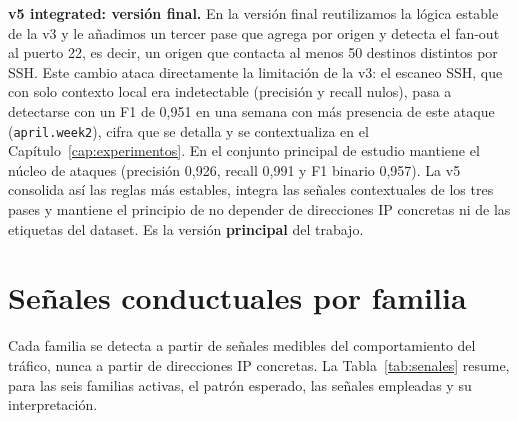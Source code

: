 \textbf{v5 integrated: versión final.} En la versión final reutilizamos la lógica estable de la v3 y le añadimos un tercer pase que agrega por origen y detecta el fan-out al puerto 22, es decir, un origen que contacta al menos 50 destinos distintos por SSH. Este cambio ataca directamente la limitación de la v3: el escaneo SSH, que con solo contexto local era indetectable (precisión y recall nulos), pasa a detectarse con un F1 de 0,951 en una semana con más presencia de este ataque (\texttt{april.week2}), cifra que se detalla y se contextualiza en el Capítulo~\ref{cap:experimentos}. En el conjunto principal de estudio mantiene el núcleo de ataques (precisión 0,926, recall 0,991 y F1 binario 0,957). La v5 consolida así las reglas más estables, integra las señales contextuales de los tres pases y mantiene el principio de no depender de direcciones IP concretas ni de las etiquetas del dataset. Es la versión \textbf{principal} del trabajo.

\section{Señales conductuales por familia}
\label{sec:alg_senales}

Cada familia se detecta a partir de señales medibles del comportamiento del tráfico, nunca a partir de direcciones IP concretas. La Tabla~\ref{tab:senales} resume, para las seis familias activas, el patrón esperado, las señales empleadas y su interpretación.


